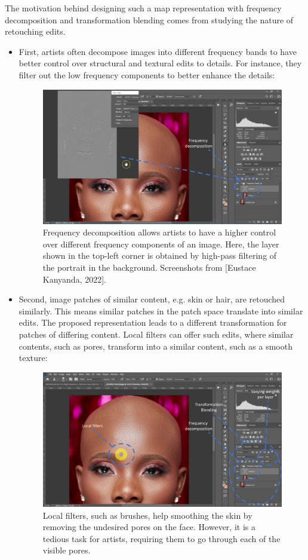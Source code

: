 The motivation behind designing such a map representation with frequency decomposition and transformation blending comes from studying the nature of retouching edits. 
\begin{itemize}
\item First, artists often decompose images into different frequency bands to have better control over structural and textural edits to details. For instance, they filter out the low frequency components to better enhance the details:

\begin{figure}[ht]
\centering
\includegraphics[width=0.55\columnwidth]{Chapters/detail-retouching-figs/PS1.pdf}
    \caption{Frequency decomposition allows artists to have a higher control over different frequency components of an image. Here, the layer shown in the top-left corner is obtained by high-pass filtering of the portrait in the background. Screenshots from [Eustace Kanyanda, 2022].}

\label{fig:PS-high-pass}
\end{figure}

\item Second, image patches of similar content, e.g. skin or hair, are retouched similarly. This means similar patches in the patch space translate into similar edits. The proposed representation leads to a different transformation for patches of differing content. Local filters can offer such edits, where similar contents, such as pores, transform into a similar content, such as a smooth texture:
\begin{figure}[ht]
\centering
\includegraphics[width=0.55\columnwidth]{Chapters/detail-retouching-figs/PS3.pdf}
    \caption{Local filters, such as brushes, help smoothing the skin by removing the undesired pores on the face. However, it is a tedious task for artists, requiring them to go through each of the visible pores.}


\end{figure}
\end{itemize}
